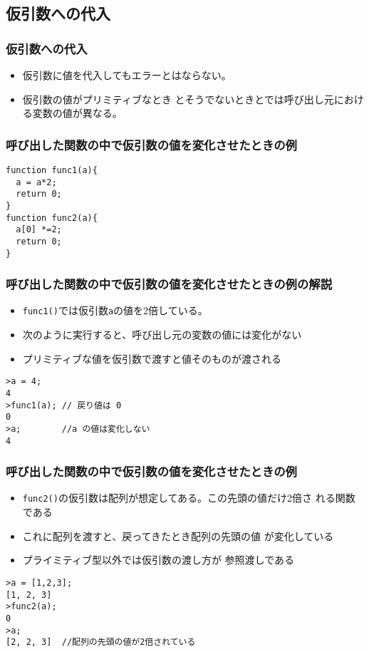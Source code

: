 \subsection{仮引数への代入}
\begin{frame}[containsverbatim]
\frametitle{仮引数への代入}
\begin{itemize}
 \item 仮引数に値を代入してもエラーとはならない。
 \item 仮引数の値がプリミティブなとき
とそうでないときとでは呼び出し元における変数の値が異なる。
\end{itemize}
\end{frame}
\begin{frame}[containsverbatim]
\frametitle{呼び出した関数の中で仮引数の値を変化させたときの例}
\begin{Verbatim}
function func1(a){
  a = a*2;
  return 0;
}
function func2(a){
  a[0] *=2;
  return 0;
}
\end{Verbatim}
\end{frame}
\begin{frame}[containsverbatim]
\frametitle{ 呼び出した関数の中で仮引数の値を変化させたときの例の解説}
\begin{itemize}
 \item  \Verb+func1()+では仮引数\Verb+a+の値を2倍している。
 \item 次のように実行すると、呼び出し元の変数の値には変化がない
 \item プリミティブな値を仮引数で渡すと値そのものが渡される
\end{itemize}
\begin{Verbatim}
>a = 4;
4
>func1(a); // 戻り値は 0
0
>a;        //a の値は変化しない
4
\end{Verbatim}
\end{frame}
\begin{frame}[containsverbatim]
\frametitle{ 呼び出した関数の中で仮引数の値を変化させたときの例}
\begin{itemize}
 \item \Verb+func2()+の仮引数は配列が想定してある。この先頭の値だけ2倍さ
       れる関数である
 \item これに配列を渡すと、戻ってきたとき配列の先頭の値
       が変化している
 \item プライミティブ型以外では仮引数の渡し方が
       参照渡しである
\end{itemize}
\begin{Verbatim}
>a = [1,2,3];
[1, 2, 3]
>func2(a);
0
>a;
[2, 2, 3]  //配列の先頭の値が2倍されている
\end{Verbatim}
\end{frame}
\iffalse
